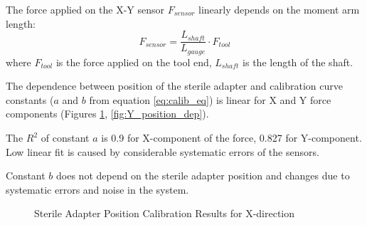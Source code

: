 	The force applied on the X-Y sensor $F_{sensor}$ linearly depends on the moment arm length:
	\begin{equation}
	F_{sensor} = \frac{L_{shaft}}{L_{gauge}} \cdot F_{tool}
	\end{equation}
	where $F_{tool}$ is the force applied on the tool end, $L_{shaft}$ is the length of the shaft.

The dependence between position of the sterile adapter and calibration curve constants ($a$ and $b$ from equation \ref{eq:calib_eq}) is linear for X and Y force components (Figures \ref{fig:X_position_dep}, \ref{fig:Y_position_dep}).

The $R^2$ of constant $a$ is 0.9 for X-component of the force, 0.827 for Y-component. Low linear fit is caused by considerable systematic errors of the sensors.

Constant $b$ does not depend on the sterile adapter position and changes due to systematic errors and noise in the system.

	
\begin{figure}[h]%
\label{fig:X_position_dep}%
\centering
{}%
\qquad
{}%
\caption{Sterile Adapter Position Calibration Results for X-direction}
\end{figure}

